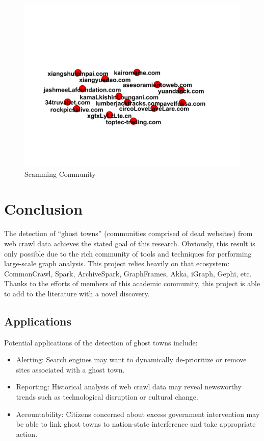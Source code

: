 \documentclass[conference]{IEEEtran}
\begin{document}
\begin{figure}[!h]
 \centerline{\includegraphics[width=\columnwidth]{figs/07after.png}}
 \caption{Scamming Community} 
 \label{fig:dead}
\end{figure}

\section{Conclusion}

The detection of ``ghost towns'' (communities comprised of dead websites) from web crawl data achieves the stated goal of this research. Obviously, this result is only possible due to the rich community of tools and techniques for performing large-scale graph analysis. This project relies heavily on that ecosystem: CommonCrawl, Spark, ArchiveSpark, GraphFrames, Akka, iGraph, Gephi, etc. Thanks to the efforts of members of this academic community, this project is able to add to the literature with a novel discovery.

\subsection{Applications}

Potential applications of the detection of ghost towns include:
\begin{itemize}
	\item Alerting: Search engines may want to dynamically de-prioritize or remove sites associated with a ghost town.
	\item Reporting: Historical analysis of web crawl data may reveal newsworthy trends such as technological disruption or cultural change.
	\item Accountability: Citizens concerned about excess government intervention may be able to link ghost towns to nation-state interference and take appropriate action.
\end{itemize}
\end{document}
